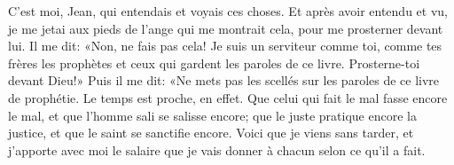 C’est moi, Jean, qui entendais et voyais ces choses.
Et après avoir entendu et vu,
	je me jetai aux pieds de l’ange qui me montrait cela, pour me prosterner devant lui.
Il me dit: «Non, ne fais pas cela!
	Je suis un serviteur comme toi,
	comme tes frères les prophètes et ceux qui gardent les paroles de ce livre.
	Prosterne-toi devant Dieu!»
Puis il me dit:
	«Ne mets pas les scellés sur les paroles de ce livre de prophétie.
	Le temps est proche, en effet.
Que celui qui fait le mal fasse encore le mal, et que l’homme sali se salisse encore;
	que le juste pratique encore la justice, et que le saint se sanctifie encore.
Voici que je viens sans tarder,
	et j’apporte avec moi le salaire que je vais donner à chacun selon ce qu’il a fait.
